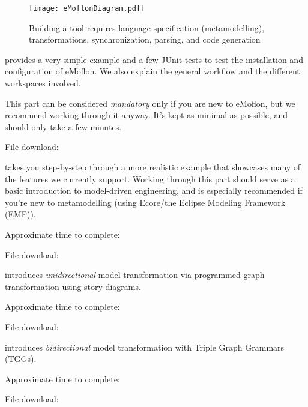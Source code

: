 \vspace*{2cm}
\begin{figure}[htbp]
	\centering
  \texttt{[image: eMoflonDiagram.pdf]}
	\caption{Building a tool requires language specification (metamodelling), transformations, synchronization, parsing, and code generation}
	\label{fig:transModel}
\end{figure}
\begin{description}

\pagebreak

\item[Part I: Installation and set up] provides a very simple example and a few JUnit tests to test the installation and configuration of eMoflon. We also
explain the general workflow and the different workspaces involved.

This part can be considered \emph{mandatory} only if you are new to eMoflon, but we recommend working through it anyway.
It's kept as minimal as possible, and should only take a few minutes.

{\small File download: \dlPartOne}

\vspace{0.5cm}
\item[Part II: Ecore] takes you step-by-step through a more realistic example that showcases many of the features we currently support.
Working through this part should serve as a basic introduction to model-driven engineering, and is especially recommended if you're new to me\-ta\-mo\-del\-ling
(using Ecore/the Eclipse Modeling Framework (EMF)).

{\small Approximate time to complete: \timeTwo
 
File download: \dlPartTwo}

\vspace{0.5cm}
\item[Part III: Story Driven Modelling (SDM)] introduces \emph{unidirectional} mo\-del transformation via programmed graph transformation using story diagrams.

{\small Approximate time to complete: \timeThree
 
File download: \dlPartThree}

\vspace{0.5cm}
\item[Part IV: TGGs] introduces \emph{bidirectional} model transformation with Triple Graph Grammars (TGGs).

{\small Approximate time to complete: \timeFour
 
File download: \dlPartFour}


\end{description}

